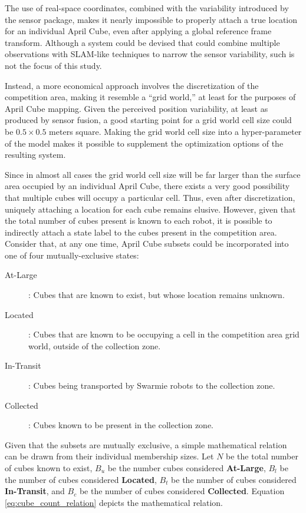 \documentclass[sigconf,authordraft]{acmart}
\begin{document}
The use of real-space coordinates, combined with the variability introduced by the sensor package, makes it nearly impossible to properly attach a true location for an individual April Cube, even after applying a global reference frame transform. Although a system could be devised that could combine multiple observations with SLAM-like techniques to narrow the sensor variability, such is not the focus of this study.

Instead, a more economical approach involves the discretization of the competition area, making it resemble a ``grid world,'' at least for the purposes of April Cube mapping. Given the perceived position variability, at least as produced by sensor fusion, a good starting point for a grid world cell size could be $0.5 \times 0.5$ meters square. Making the grid world cell size into a hyper-parameter of the model makes it possible to supplement the optimization options of the resulting system.

Since in almost all cases the grid world cell size will be far larger than the surface area occupied by an individual April Cube, there exists a very good possibility that multiple cubes will occupy a particular cell. Thus, even after discretization, uniquely attaching a location for each cube remains elusive. However, given that the total number of cubes present is known to each robot, it is possible to indirectly attach a state label to the cubes present in the competition area. Consider that, at any one time, April Cube subsets could be incorporated into one of four mutually-exclusive states:

\begin{description}
  \item[At-Large]: Cubes that are known to exist, but whose location remains unknown.
  \item[Located]: Cubes that are known to be occupying a cell in the competition area grid world, outside of the collection zone.
  \item[In-Transit]: Cubes being transported by Swarmie robots to the collection zone.
  \item[Collected]: Cubes known to be present in the collection zone.
\end{description}

Given that the subsets are mutually exclusive, a simple mathematical relation can be drawn from their individual membership sizes. Let $N$ be the total number of cubes known to exist, $B_u$ be the number cubes considered \textbf{At-Large}, $B_l$ be the number of cubes considered \textbf{Located}, $B_t$ be the number of cubes considered \textbf{In-Transit}, and $B_c$ be the number of cubes considered \textbf{Collected}. Equation \ref{eq:cube_count_relation} depicts the mathematical relation.
\end{document}
